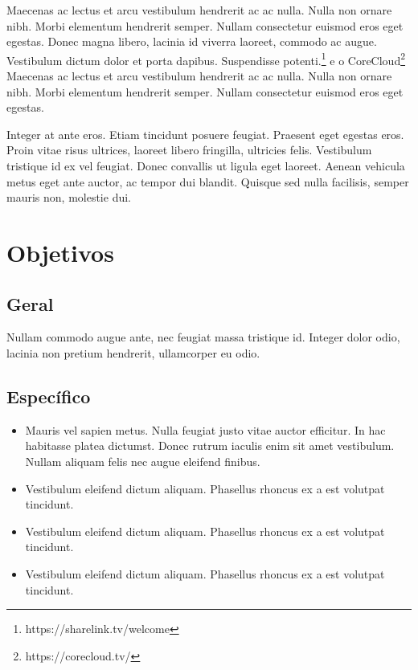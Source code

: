 \documentclass[
	12pt,				%
	openright,			%
	oneside,			%
	a4paper,			%
	chapter=TITLE,		%
	english,			%
	brazil,				%
	]{abntex2}
\begin{document}
Maecenas ac lectus et arcu vestibulum hendrerit ac ac nulla. Nulla non ornare nibh. Morbi elementum hendrerit semper. Nullam consectetur euismod eros eget egestas. Donec magna libero, lacinia id viverra laoreet, commodo ac augue. Vestibulum dictum dolor et porta dapibus. Suspendisse potenti.\footnote{https://sharelink.tv/welcome} e o CoreCloud\footnote{https://corecloud.tv/}  Maecenas ac lectus et arcu vestibulum hendrerit ac ac nulla. Nulla non ornare nibh. Morbi elementum hendrerit semper. Nullam consectetur euismod eros eget egestas.

Integer at ante eros. Etiam tincidunt posuere feugiat. Praesent eget egestas eros. Proin vitae risus ultrices, laoreet libero fringilla, ultricies felis. Vestibulum tristique id ex vel feugiat. Donec convallis ut ligula eget laoreet. Aenean vehicula metus eget ante auctor, ac tempor dui blandit. Quisque sed nulla facilisis, semper mauris non, molestie dui.


\chapter{Objetivos}
\section{Geral}
Nullam commodo augue ante, nec feugiat massa tristique id. Integer dolor odio, lacinia non pretium hendrerit, ullamcorper eu odio.


\section{Específico}
\begin{itemize}
\item Mauris vel sapien metus. Nulla feugiat justo vitae auctor efficitur. In hac habitasse platea dictumst. Donec rutrum iaculis enim sit amet vestibulum. Nullam aliquam felis nec augue eleifend finibus.
\item Vestibulum eleifend dictum aliquam. Phasellus rhoncus ex a est volutpat tincidunt.
\item Vestibulum eleifend dictum aliquam. Phasellus rhoncus ex a est volutpat tincidunt.
\item Vestibulum eleifend dictum aliquam. Phasellus rhoncus ex a est volutpat tincidunt.
\end{itemize} 
\end{document}
